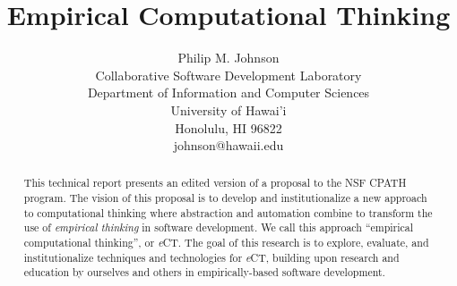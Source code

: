\documentclass{proposalnsf}
\newcommand{\eCT}{{\it e}CT}
\begin{document}
\title{Empirical Computational Thinking}

\author{Philip M. Johnson \\
      Collaborative Software Development Laboratory \\
      Department of Information and Computer Sciences \\
      University of Hawai'i \\
      Honolulu, HI 96822 \\
      johnson@hawaii.edu\\
}

\maketitle

\begin{abstract}
\noindent This technical report presents an edited version of a proposal to the NSF 
CPATH program. The vision of this proposal is to develop and
institutionalize a new approach to computational thinking where abstraction
and automation combine to transform the use of {\em empirical thinking} in
software development.  We call this approach ``empirical computational
thinking'', or \eCT.  The goal of this research is to explore, evaluate,
and institutionalize techniques and technologies for \eCT, building upon
research and education by ourselves and others in empirically-based
software development.
\end{abstract}




\end{document}
